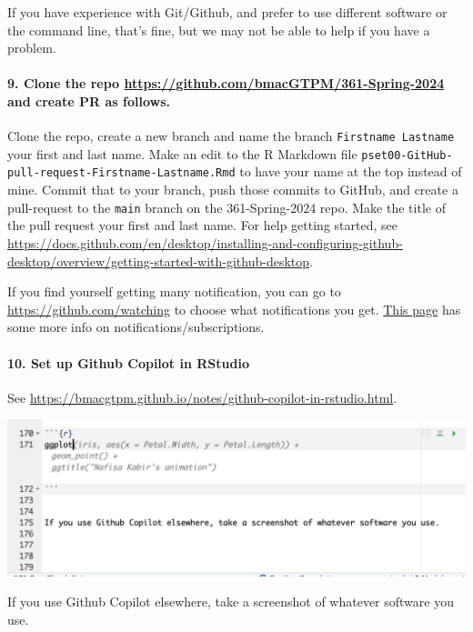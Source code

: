 \documentclass[
]{article}
\begin{document}
If you have experience with Git/Github, and prefer to use different
software or the command line, that's fine, but we may not be able to
help if you have a problem.

\paragraph{\texorpdfstring{9. Clone the repo
\url{https://github.com/bmacGTPM/361-Spring-2024} and create PR as
follows.}{9. Clone the repo https://github.com/bmacGTPM/361-Spring-2024 and create PR as follows.}}\label{clone-the-repo-httpsgithub.combmacgtpm361-spring-2024-and-create-pr-as-follows.}

Clone the repo, create a new branch and name the branch
\texttt{Firstname\ Lastname} your first and last name. Make an edit to
the R Markdown file
\texttt{pset00-GitHub-pull-request-Firstname-Lastname.Rmd} to have your
name at the top instead of mine. Commit that to your branch, push those
commits to GitHub, and create a pull-request to the \texttt{main} branch
on the 361-Spring-2024 repo. Make the title of the pull request your
first and last name. For help getting started, see
\url{https://docs.github.com/en/desktop/installing-and-configuring-github-desktop/overview/getting-started-with-github-desktop}.

If you find yourself getting many notification, you can go to
\url{https://github.com/watching} to choose what notifications you get.
\href{https://docs.github.com/en/account-and-profile/managing-subscriptions-and-notifications-on-github/managing-subscriptions-for-activity-on-github/managing-your-subscriptions}{This
page} has some more info on notifications/subscriptions.

\paragraph{10. Set up Github Copilot in
RStudio}\label{set-up-github-copilot-in-rstudio}

See
\url{https://bmacgtpm.github.io/notes/github-copilot-in-rstudio.html}.

\includegraphics{img/snip of GitHub Copilot.png}

If you use Github Copilot elsewhere, take a screenshot of whatever
software you use.
\end{document}

